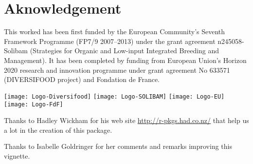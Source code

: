 
\section*{Aknowledgement} 
This worked has been first funded by the European Community’s Seventh Framework Programme (FP7/9 2007–2013) under the grant agreement n245058-Solibam (Strategies for Organic and Low-input Integrated Breeding and Management).
It has been completed by funding from European Union’s Horizon 2020 research and innovation programme under grant agreement No 633571 (DIVERSIFOOD project) and Fondation de France.


\begin{center}
\texttt{[image: Logo-Diversifood]} \hspace{.5cm}
\texttt{[image: Logo-SOLIBAM]} \hspace{.5cm}
\texttt{[image: Logo-EU]} \hspace{.5cm}
\texttt{[image: Logo-FdF]}
\end{center}

Thanks to Hadley Wickham for his web site \url{http://r-pkgs.had.co.nz/} that help us a lot in the creation of this package.

Thanks to Isabelle Goldringer for her comments and remarks improving this vignette.


